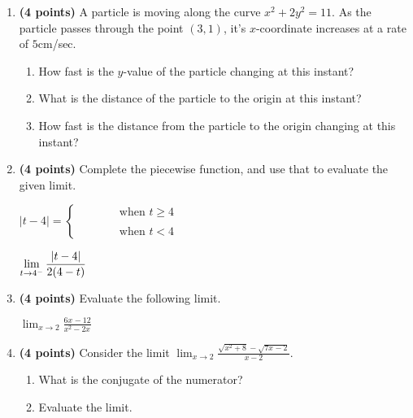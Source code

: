 \documentclass[12pt]{amsart}
\begin{document}
\begin{enumerate}
\vspace{2cm}
\newpage\def \b{2}\def \x{3}\def \y{1}\def \xchange{5}\def \ratrhs{3}\def \cirrhs{11}\def \hyprhs{7}\def \compy{2y^{2}}\def \ychangenum{5}\def \dist{10}\def \fracrat{\frac{80}{3}}\def \fraccirc{15}\def \frachyp{45}
\item {\bf (4 points)} 
 A particle is moving along the curve $x^2 + \compy = \cirrhs$. As the particle passes through the point $(\x,\y)$, it's $x$-coordinate increases at a rate of $\xchange$cm/sec. \begin{enumerate}
\item How fast is the $y$-value of the particle changing at this instant? \vfill
\item What is the distance of the particle to the origin at this instant? \vfill
\item How fast is the distance from the particle to the origin changing at this instant? \vfill
\end{enumerate}

\newpage\def \a{4}\def \k{2}\def \abstop{1}\def \ktop{0}
\item {\bf (4 points)} 
 Complete the piecewise function, and use that to evaluate the given limit.

\vspace{.5cm}

$|t- \a| = \begin{cases} \hspace{1cm} & \text{ when } t \geq \a \\ & \\ \hspace{1cm} & \text{ when } t < \a \end{cases}$

\vspace{.5cm}

$\displaystyle \lim_{t \rightarrow \a^-} \frac{\ifthenelse{\ktop=1}{\k}{}\ifthenelse{\abstop=1}{|t-\a|}{(\a-t)}}{\ifthenelse{\ktop=0}{\k}{}\ifthenelse{\abstop=0}{|t-\a|}{(\a-t)}}$

\vfill 
\def \a{2}\def \b{0}\def \k{6}\def \fancyp{x^{2}-2x^{}}\def \simplep{6x^{}-12}\def \fancyreduced{2}\def \niceanstop{\frac{1}{3}}\def \niceansbottom{3}
\item {\bf (4 points)} 
 Evaluate the following limit. 

$\displaystyle \lim_{x\rightarrow \a} \frac{\simplep}{\fancyp}$

\vfill 
\newpage\def \a{2}\def \b{5}\def \ab{10}\def \c{8}\def \amb{-3}\def \ansroot{12}\def \firstroot{x^{2}+8}\def \secondroot{7x^{}-2}\def \porm{1}
\item {\bf (4 points)} 
 Consider the limit $\displaystyle \lim_{x \rightarrow \a} \frac{\sqrt{\firstroot} - \sqrt{\secondroot}}{x-\a}$. \begin{enumerate}
\item What is the conjugate of the numerator? \vspace{3cm}
\item Evaluate the limit.
\end{enumerate}


\end{enumerate}
\end{document}
